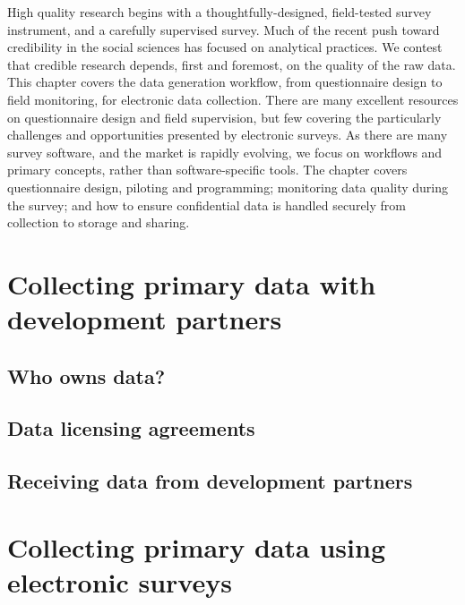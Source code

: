 
\begin{fullwidth}
High quality research begins with a thoughtfully-designed, field-tested survey instrument, and a carefully supervised survey.
Much of the recent push toward credibility in the social sciences has focused on analytical practices.
We contest that credible research depends, first and foremost, on the quality of the raw data. This chapter covers the data generation workflow, from questionnaire design to field monitoring, for electronic data collection.
There are many excellent resources on questionnaire design and field supervision,
but few covering the particularly challenges and opportunities presented by electronic surveys.
As there are many survey software, and the market is rapidly evolving, we focus on workflows and primary concepts, rather than software-specific tools.
The chapter covers questionnaire design, piloting and programming; monitoring data quality during the survey; and how to ensure confidential data is handled securely from collection to storage and sharing.


\end{fullwidth}

\section{Collecting primary data with development partners}

\subsection{Who owns data?}

\subsection{Data licensing agreements}

\subsection{Receiving data from development partners}

\section{Collecting primary data using electronic surveys}

